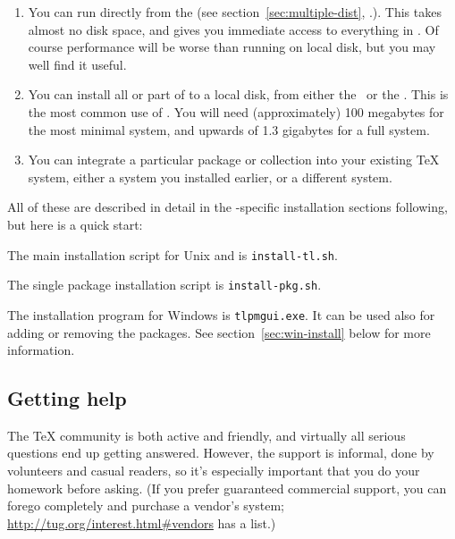 \documentclass{article}
\begin{document}
\begin{enumerate}

\item You can run \TL{} directly from the  \DVD
(see section~\ref{sec:multiple-dist}, \p.\pageref{sec:multiple-dist}).
This takes almost no disk space, and gives you immediate access to
everything in \TL{}.  Of course performance will be worse than running
on local disk, but you may well find it useful.

\item You can install all or part of \TL{} to a local disk, from either
the \DVD\ or the  .  This is the most common use
of \TL.  You will need (approximately) 100 megabytes for the most
minimal system, and upwards of 1.3 gigabytes for a full system.

\item You can integrate a particular package or collection into your
existing \TeX{} system, either a \TL{} system you installed
earlier, or a different system.

\end{enumerate}

\noindent All of these are described in detail in the -specific
installation sections following, but here is a quick start:

\begin{itemize*}

\item The main installation script for Unix and \MacOSX{} is
\texttt{install-tl.sh}.

\item The single package installation script is \texttt{install-pkg.sh}.

\item The installation program for Windows is \texttt{tlpmgui.exe}.
It can be used also for adding or removing the packages.
See section~\ref{sec:win-install} below for more information.

\end{itemize*}


\subsection{Getting help}
\label{sec:help}

The \TeX{} community is both active and friendly, and virtually all
serious questions end up getting answered.  However, the support is
informal, done by volunteers and casual readers, so it's especially
important that you do your homework before asking.  (If you prefer
guaranteed commercial support, you can forego \TL{} completely and
purchase a vendor's system; \url{http://tug.org/interest.html#vendors}
has a list.)
\end{document}
